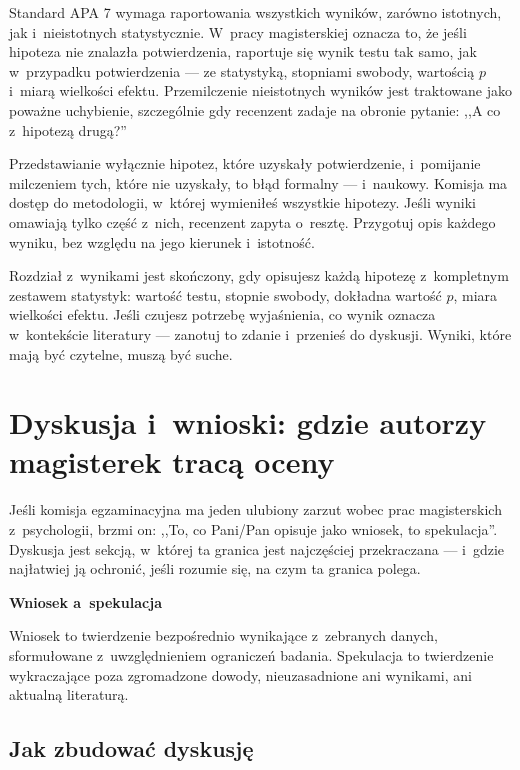 \documentclass[12pt,a4paper,twoside,openany]{book}
\let\bforigsection\section
\renewcommand{\section}{\needspace{4\baselineskip}\bforigsection}
\newcommand{\concept}[2]{%
  \par\vspace{6pt}
  \begin{tcolorbox}[enhanced, breakable, colback=accent!6, colframe=accent,
    boxrule=0pt, leftrule=3.5pt, arc=2pt, drop fuzzy shadow={black!15},
    left=10pt, right=10pt, top=7pt, bottom=7pt, before upper={\parindent0pt}]
    {\sffamily\bfseries\color{accent}#1}\par\vspace{2pt}\small #2
  \end{tcolorbox}\par
}
\begin{document}
Standard APA 7 wymaga raportowania wszystkich wyników, zarówno istotnych, jak i~nieistotnych statystycznie. W~pracy magisterskiej oznacza to, że jeśli hipoteza nie znalazła potwierdzenia, raportuje się wynik testu tak samo, jak w~przypadku potwierdzenia --- ze statystyką, stopniami swobody, wartością $p$ i~miarą wielkości efektu. Przemilczenie nieistotnych wyników jest traktowane jako poważne uchybienie, szczególnie gdy recenzent zadaje na obronie pytanie: ,,A co z~hipotezą drugą?''

\begin{warningbox}
Przedstawianie wyłącznie hipotez, które uzyskały potwierdzenie, i~pomijanie milczeniem tych, które nie uzyskały, to błąd formalny --- i~naukowy. Komisja ma dostęp do metodologii, w~której wymieniłeś wszystkie hipotezy. Jeśli wyniki omawiają tylko część z~nich, recenzent zapyta o~resztę. Przygotuj opis każdego wyniku, bez względu na jego kierunek i~istotność.
\end{warningbox}

\begin{keyinsight}
Rozdział z~wynikami jest skończony, gdy opisujesz każdą hipotezę z~kompletnym zestawem statystyk: wartość testu, stopnie swobody, dokładna wartość $p$, miara wielkości efektu. Jeśli czujesz potrzebę wyjaśnienia, co wynik oznacza w~kontekście literatury --- zanotuj to zdanie i~przenieś do dyskusji. Wyniki, które mają być czytelne, muszą być suche.
\end{keyinsight}

\section{Dyskusja i~wnioski: gdzie autorzy magisterek tracą oceny}

Jeśli komisja egzaminacyjna ma jeden ulubiony zarzut wobec prac magisterskich z~psychologii, brzmi on: ,,To, co Pani/Pan opisuje jako wniosek, to spekulacja''. Dyskusja jest sekcją, w~której ta granica jest najczęściej przekraczana --- i~gdzie najłatwiej ją ochronić, jeśli rozumie się, na czym ta granica polega.

\concept{Wniosek a~spekulacja}{Wniosek to twierdzenie bezpośrednio wynikające z~zebranych danych, sformułowane z~uwzględnieniem ograniczeń badania. Spekulacja to twierdzenie wykraczające poza zgromadzone dowody, nieuzasadnione ani wynikami, ani aktualną literaturą.}

\subsection{Jak zbudować dyskusję}
\end{document}
